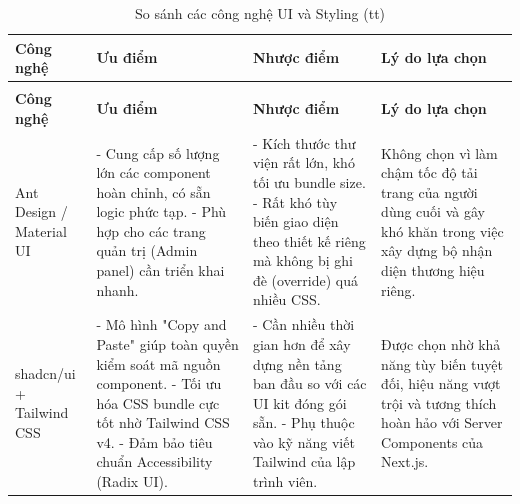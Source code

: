 \begin{center}
    \renewcommand{\arraystretch}{1.5}
    \begin{longtable}{|p{2.5cm}|p{4cm}|p{4cm}|p{3.5cm}|}
        \caption{So sánh các công nghệ UI và Styling} \label{tab:ui_comparison}                                                                                                                                       \\
        \hline
        \centering\textbf{Công nghệ}                                                                  & \centering\textbf{Ưu điểm} & \centering\textbf{Nhược điểm} & \centering\arraybackslash\textbf{Lý do lựa chọn} \\ \hline
        \endfirsthead

        \caption[]{So sánh các công nghệ UI và Styling (tt)}                                                                                                                                                          \\ \hline
        \centering\textbf{Công nghệ}                                                                  & \centering\textbf{Ưu điểm} & \centering\textbf{Nhược điểm} & \centering\arraybackslash\textbf{Lý do lựa chọn} \\ \hline
        \endhead

        Ant Design / Material UI                                                                      &
        - Cung cấp số lượng lớn các component hoàn chỉnh, có sẵn logic phức tạp. \newline
        - Phù hợp cho các trang quản trị (Admin panel) cần triển khai nhanh.                          &
        - Kích thước thư viện rất lớn, khó tối ưu bundle size. \newline
        - Rất khó tùy biến giao diện theo thiết kế riêng mà không bị ghi đè (override) quá nhiều CSS. &
        Không chọn vì làm chậm tốc độ tải trang của người dùng cuối và gây khó khăn trong việc xây dựng bộ nhận diện thương hiệu riêng.                                                                               \\ \hline

        shadcn/ui + Tailwind CSS                                                                      &
        - Mô hình "Copy and Paste" giúp toàn quyền kiểm soát mã nguồn component. \newline
        - Tối ưu hóa CSS bundle cực tốt nhờ Tailwind CSS v4. \newline
        - Đảm bảo tiêu chuẩn Accessibility (Radix UI).                                                &
        - Cần nhiều thời gian hơn để xây dựng nền tảng ban đầu so với các UI kit đóng gói sẵn. \newline
        - Phụ thuộc vào kỹ năng viết Tailwind của lập trình viên.                                     &
        Được chọn nhờ khả năng tùy biến tuyệt đối, hiệu năng vượt trội và tương thích hoàn hảo với Server Components của Next.js.                                                                                     \\ \hline
    \end{longtable}
\end{center}


